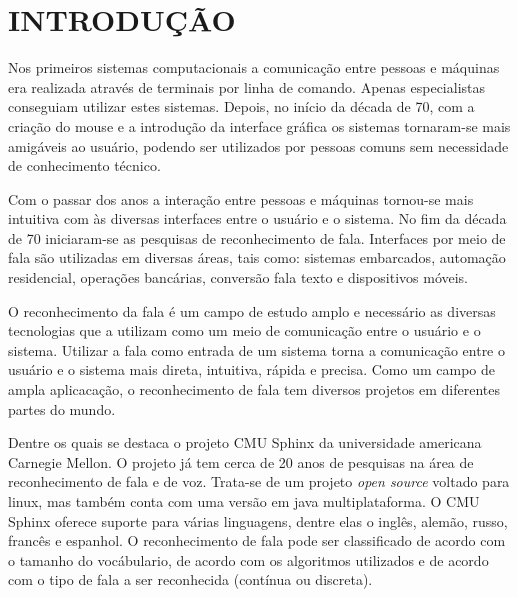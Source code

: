 \chapter{INTRODUÇÃO}
\label{chap:introducao}
 \thispagestyle{plain}


\quad Nos primeiros sistemas computacionais a comunicação entre pessoas e máquinas era realizada através de terminais por linha de comando.  Apenas especialistas conseguiam utilizar estes sistemas.
Depois, no início da década de 70, com a criação do mouse e a introdução da interface gráfica  os sistemas tornaram-se mais amigáveis ao usuário, podendo ser utilizados por pessoas comuns sem necessidade de conhecimento técnico.

\quad  Com o passar dos anos a interação entre pessoas e máquinas tornou-se mais intuitiva com às diversas interfaces entre o usuário e o sistema. No fim da década de 70 iniciaram-se as pesquisas de reconhecimento de fala.
Interfaces por meio de fala são utilizadas em diversas áreas, tais como: sistemas embarcados, automação residencial, operações bancárias, conversão fala texto e dispositivos móveis.

\quad O reconhecimento da fala é um campo de estudo amplo e necessário as diversas tecnologias que a utilizam como um  meio de comunicação entre o usuário e o sistema. Utilizar a fala como entrada de um sistema
torna a comunicação entre o usuário e o sistema mais direta, intuitiva, rápida e precisa. Como um campo de ampla aplicacação, o reconhecimento de fala tem diversos projetos em diferentes partes do mundo.

\quad Dentre os quais se destaca o projeto CMU Sphinx da universidade americana Carnegie Mellon. O projeto já tem cerca de 20 anos de pesquisas na área de reconhecimento de fala e de voz. Trata-se de um projeto \textit{open source} voltado para linux, mas também conta com uma versão em java multiplataforma. O CMU Sphinx oferece suporte para várias linguagens, dentre elas o inglês, alemão, russo, francês e espanhol. 
O reconhecimento de fala pode ser classificado de acordo com o tamanho do vocábulario, de acordo com os algoritmos utilizados e de acordo com o tipo de fala a ser reconhecida (contínua ou discreta).




